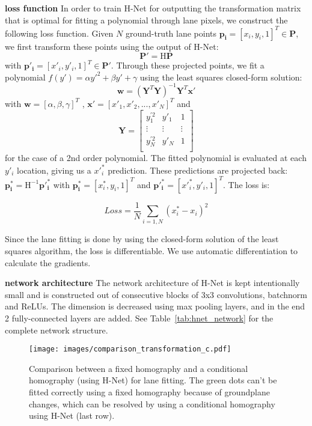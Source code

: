 \documentclass[letterpaper, 10 pt, conference]{ieeeconf}
\begin{document}
\textbf{loss function} In order to train H-Net for outputting the transformation matrix that is optimal for fitting a polynomial through lane pixels, we construct the following loss function. Given $N$ ground-truth lane points $\mathbf{p_i}=[x_i,y_i,1]^T \in \mathbf{P}$, we first transform these points using the output of H-Net:
$$\mathbf{P'}= \mathrm{H}\mathbf{P}$$
with $\mathbf{p'_i} = [x'_i,y'_i,1]^T \in \mathbf{P'}$.
Through these projected points, we fit a polynomial $f(y') = \alpha y'^2 + \beta y' + \gamma$ using the least squares closed-form solution:
$$\mathbf{w} = (\mathbf{Y}^T\mathbf{Y})^{-1}\mathbf{Y}^T\mathbf{x'}$$
with $\mathbf{w}=[\alpha, \beta, \gamma]^T$ , $\mathbf{x}'=[x'_1, x'_2, ... , x'_N]^T$ and 
$$	\mathbf{Y} = 
	\begin{bmatrix}
    	y_1^{'2} & y'_1 & 1 \\
        \vdots & \vdots & \vdots \\
        y_N^{'2} & y'_N & 1 \\
    \end{bmatrix}
$$
for the case of a 2nd order polynomial. The fitted polynomial is evaluated at each $y'_i$ location, giving us a $x'^*_i$ prediction. 
These predictions are projected back: $\mathbf{p^*_i}=\mathrm{H^{-1}}\mathbf{p'^*_i}$ with $\mathbf{p^*_i}=[x^*_i,y_i,1]^T$ and $\mathbf{p'^*_i}=[x'^*_i,y'_i,1]^T$.
The loss is: 

$$Loss = \frac{1}{N}\sum_{i=1,N}(x^*_i - x_i)^2$$

Since the lane fitting is done by using the closed-form solution of the least squares algorithm, the loss is differentiable. We use automatic differentiation to calculate the gradients. 

\textbf{network architecture} The network architecture of H-Net is kept intentionally small and is constructed out of consecutive blocks of 3x3 convolutions, batchnorm and ReLUs. The dimension is decreased using max pooling layers, and in the end 2 fully-connected layers are added. See Table~\ref{tab:hnet_network} for the complete network structure. 


\begin{figure}
	\begin{center}
		\texttt{[image: images/comparison\_transformation\_c.pdf]}
	\end{center}
	\caption{Comparison between a fixed homography and a conditional homography (using H-Net) for lane fitting. The green dots can't be fitted correctly using a fixed homography because of groundplane changes, which can be resolved by using a conditional homography using H-Net (last row).}
	\label{fig:comp_transf}
\end{figure}
\end{document}

